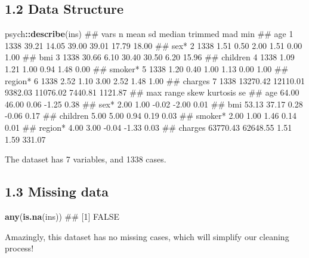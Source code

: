 \documentclass[]{article}
\newenvironment{Shaded}{\begin{snugshade}}{\end{snugshade}}
\newcommand{\KeywordTok}[1]{\textcolor[rgb]{0.13,0.29,0.53}{\textbf{#1}}}
\newcommand{\OperatorTok}[1]{\textcolor[rgb]{0.81,0.36,0.00}{\textbf{#1}}}
\newcommand{\NormalTok}[1]{#1}
\begin{document}
\subsection{1.2 Data Structure}\label{data-structure}

\begin{Shaded}
\begin{Highlighting}[]
\NormalTok{psych}\OperatorTok{::}\KeywordTok{describe}\NormalTok{(ins)}
\NormalTok{##          vars    n     mean       sd  median  trimmed     mad     min}
\NormalTok{## age         1 1338    39.21    14.05   39.00    39.01   17.79   18.00}
\NormalTok{## sex*        2 1338     1.51     0.50    2.00     1.51    0.00    1.00}
\NormalTok{## bmi         3 1338    30.66     6.10   30.40    30.50    6.20   15.96}
\NormalTok{## children    4 1338     1.09     1.21    1.00     0.94    1.48    0.00}
\NormalTok{## smoker*     5 1338     1.20     0.40    1.00     1.13    0.00    1.00}
\NormalTok{## region*     6 1338     2.52     1.10    3.00     2.52    1.48    1.00}
\NormalTok{## charges     7 1338 13270.42 12110.01 9382.03 11076.02 7440.81 1121.87}
\NormalTok{##               max    range  skew kurtosis     se}
\NormalTok{## age         64.00    46.00  0.06    -1.25   0.38}
\NormalTok{## sex*         2.00     1.00 -0.02    -2.00   0.01}
\NormalTok{## bmi         53.13    37.17  0.28    -0.06   0.17}
\NormalTok{## children     5.00     5.00  0.94     0.19   0.03}
\NormalTok{## smoker*      2.00     1.00  1.46     0.14   0.01}
\NormalTok{## region*      4.00     3.00 -0.04    -1.33   0.03}
\NormalTok{## charges  63770.43 62648.55  1.51     1.59 331.07}
\end{Highlighting}
\end{Shaded}

The dataset has 7 variables, and 1338 cases.

\subsection{1.3 Missing data}\label{missing-data}

\begin{Shaded}
\begin{Highlighting}[]
\KeywordTok{any}\NormalTok{(}\KeywordTok{is.na}\NormalTok{(ins))}
\NormalTok{## [1] FALSE}
\end{Highlighting}
\end{Shaded}

Amazingly, this dataset has no missing cases, which will simplify our
cleaning process!
\end{document}
